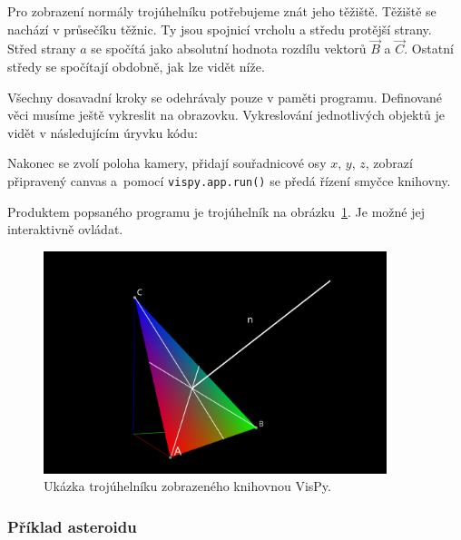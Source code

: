\documentclass[11pt]{article}
\begin{document}


Pro zobrazení normály trojúhelníku potřebujeme znát jeho těžiště. Těžiště se nachází v průsečíku těžnic. Ty jsou spojnicí vrcholu a středu protější strany. Střed strany $a$ se spočítá jako absolutní hodnota rozdílu vektorů $\vec B$ a $\vec C$. Ostatní středy se spočítají obdobně, jak lze vidět níže.



Všechny dosavadní kroky se odehrávaly pouze v paměti programu. Definované věci musíme ještě vykreslit na obrazovku. Vykreslování jednotlivých objektů je vidět v následujícím úryvku kódu:



Nakonec se zvolí poloha kamery,
přidají souřadnicové osy $x$, $y$, $z$,
zobrazí připravený canvas
a~pomocí \verb|vispy.app.run()| se předá řízení smyčce knihovny.



Produktem popsaného programu je trojúhelník na obrázku~\ref{triangle_example}.
Je možné jej interaktivně ovládat.

\begin{figure}[h]
\includegraphics[width=10cm]{figs/triangle_example.png}
\centering
\caption{Ukázka trojúhelníku zobrazeného knihovnou VisPy.}
\label{triangle_example}
\end{figure}


\subsubsection{Příklad asteroidu}
\end{document}

